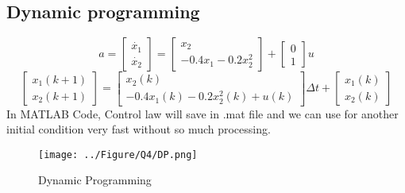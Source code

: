\subsection{Dynamic programming}
$$
a = \begin{bmatrix}
	\dot{x_1}\\
	\dot{x_2}
\end{bmatrix} = \begin{bmatrix}
	x_2\\
	-0.4x_1 -0.2x_2^2
\end{bmatrix} + \begin{bmatrix}
	0\\
	1
\end{bmatrix}u
$$
$$
\begin{bmatrix}
	x_1(k+1)\\
	x_2(k+1)
\end{bmatrix} = \begin{bmatrix}
	x_2(k)\\
	-0.4x_1(k) -0.2x_2^2(k) + u(k)
\end{bmatrix} \Delta t + \begin{bmatrix}
	x_1(k)\\
	x_2(k)
\end{bmatrix}
$$
In MATLAB Code, Control law will save in .mat file and we can use for another initial condition very fast without so much processing.
\begin{figure}[H]
	\caption{Dynamic Programming}
	\centering
	\texttt{[image: ../Figure/Q4/DP.png]}
\end{figure}